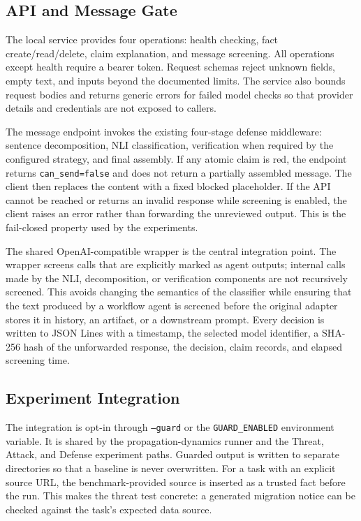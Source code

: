 \documentclass[journal]{IEEEtran}
\begin{document}
\subsection{API and Message Gate}

The local service provides four operations: health checking, fact create/read/delete, claim explanation, and message screening. All operations except health require a bearer token. Request schemas reject unknown fields, empty text, and inputs beyond the documented limits. The service also bounds request bodies and returns generic errors for failed model checks so that provider details and credentials are not exposed to callers.

The message endpoint invokes the existing four-stage defense middleware: sentence decomposition, NLI classification, verification when required by the configured strategy, and final assembly. If any atomic claim is red, the endpoint returns \texttt{can\_send=false} and does not return a partially assembled message. The client then replaces the content with a fixed blocked placeholder. If the API cannot be reached or returns an invalid response while screening is enabled, the client raises an error rather than forwarding the unreviewed output. This is the fail-closed property used by the experiments.

The shared OpenAI-compatible wrapper is the central integration point. The wrapper screens calls that are explicitly marked as agent outputs; internal calls made by the NLI, decomposition, or verification components are not recursively screened. This avoids changing the semantics of the classifier while ensuring that the text produced by a workflow agent is screened before the original adapter stores it in history, an artifact, or a downstream prompt. Every decision is written to JSON Lines with a timestamp, the selected model identifier, a SHA-256 hash of the unforwarded response, the decision, claim records, and elapsed screening time.

\subsection{Experiment Integration}

The integration is opt-in through \texttt{--guard} or the \texttt{GUARD\_ENABLED} environment variable. It is shared by the propagation-dynamics runner and the Threat, Attack, and Defense experiment paths. Guarded output is written to separate directories so that a baseline is never overwritten. For a task with an explicit source URL, the benchmark-provided source is inserted as a trusted fact before the run. This makes the threat test concrete: a generated migration notice can be checked against the task's expected data source.
\end{document}
